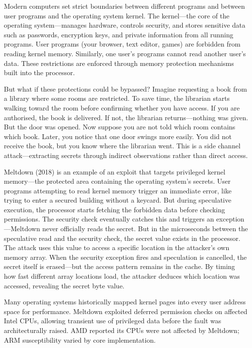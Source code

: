 Modern computers set strict boundaries between different programs and between user programs and the operating system kernel. The kernel—the core of the operating system—manages hardware, controls security, and stores sensitive data such as passwords, encryption keys, and private information from all running programs. User programs (your browser, text editor, games) are forbidden from reading kernel memory. Similarly, one user's programs cannot read another user's data. These restrictions are enforced through memory protection mechanisms built into the processor.

But what if these protections could be bypassed? Imagine requesting a book from a library where some rooms are restricted. To save time, the librarian starts walking toward the room before confirming whether you have access. If you are authorised, the book is delivered. If not, the librarian returns—nothing was given. But the door was opened. Now suppose you are not told which room contains which book. Later, you notice that one door swings more easily. You did not receive the book, but you know where the librarian went. This is a side channel attack—extracting secrets through indirect observations rather than direct access.

Meltdown (2018) is an example of an exploit that targets privileged kernel memory—the protected area containing the operating system's secrets. User programs attempting to read kernel memory trigger an immediate error, like trying to enter a secured building without a keycard. But during speculative execution, the processor starts fetching the forbidden data before checking permissions. The security check eventually catches this and triggers an exception—Meltdown never \QSOpen{}officially\QSClose{} reads the secret. But in the microseconds between the speculative read and the security check, the secret value exists in the processor. The attack uses this value to access a specific location in the attacker's own memory array. When the security exception fires and speculation is cancelled, the secret itself is erased—but the access pattern remains in the cache. By timing how fast different array locations load, the attacker deduces which location was accessed, revealing the secret byte value.

Many operating systems historically mapped kernel pages into every user address space for performance. Meltdown exploited deferred permission checks on affected Intel CPUs, allowing transient use of privileged data before the fault was architecturally raised. AMD reported its CPUs were not affected by Meltdown; ARM susceptibility varied by core implementation.


